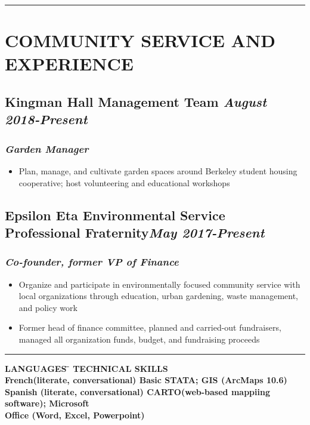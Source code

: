 \documentclass{article}
\begin{document}
\noindent\rule{19cm}{0.4pt}

\section*{\textsc{\large COMMUNITY SERVICE AND EXPERIENCE}}
\subsection*{\bf{Kingman Hall Management Team} \hfill \textit{\small August 2018-Present}}
\subsubsection*{\textit{Garden Manager}}
\begin{itemize}
\item {Plan, manage, and cultivate garden spaces around Berkeley  student housing cooperative; host volunteering and educational workshops}
\end{itemize}

\subsection*{\bf{Epsilon Eta Environmental Service Professional Fraternity}\hfill \textit{\small May 2017-Present}}
\subsubsection*{\textit{Co-founder, former VP of Finance}}
\begin{itemize}
    \item {Organize and participate in environmentally focused  community service with local organizations through education, urban gardening, waste management, and policy work}
    \item{Former head of finance committee, planned and carried-out fundraisers, managed all organization funds, budget, and fundraising proceeds}
\end{itemize}


\noindent\rule{19cm}{0.4pt}
\begin{tabbing}
\hspace{0.5in}\bf{LANGUAGES} \= \hspace{2.5in}
\bf{TECHNICAL SKILLS} \\
\hspace{0.5in}French(literate, conversational) \> \hspace{2.5in}Basic STATA; GIS (ArcMaps 10.6) \\ 
\hspace{0.5in}Spanish (literate, conversational) \> \hspace{2.5in}CARTO(web-based mappiing software); Microsoft\\ \> \hspace{2.5in}Office (Word, Excel, Powerpoint)
\end{tabbing}
\end{document}
